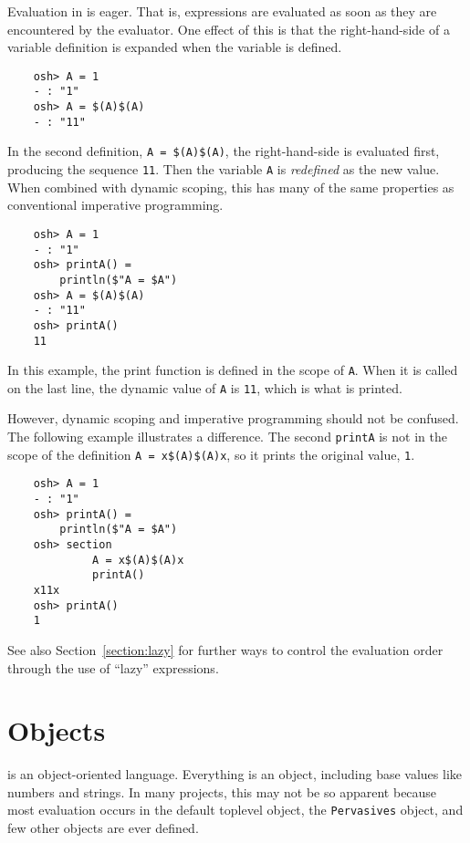 \label{section:eager}

Evaluation in  is eager.  That is, expressions are evaluated as soon as they are
encountered by the evaluator.  One effect of this is that the right-hand-side of a variable
definition is expanded when the variable is defined.

\begin{verbatim}
    osh> A = 1
    - : "1"
    osh> A = $(A)$(A)
    - : "11"
\end{verbatim}

In the second definition, \verb+A = $(A)$(A)+, the right-hand-side is evaluated first, producing the
sequence \verb+11+.  Then the variable \verb+A+ is \emph{redefined} as the new value.  When combined
with dynamic scoping, this has many of the same properties as conventional imperative programming.

\begin{verbatim}
    osh> A = 1
    - : "1"
    osh> printA() =
        println($"A = $A")
    osh> A = $(A)$(A)
    - : "11"
    osh> printA()
    11
\end{verbatim}

In this example, the print function is defined in the scope of \verb+A+.  When it is called on
the last line, the dynamic value of \verb+A+ is \verb+11+, which is what is printed.

However, dynamic scoping and imperative programming should not be confused.  The following example
illustrates a difference.  The second \verb+printA+ is not in the scope of the definition
\verb+A = x$(A)$(A)x+, so it prints the original value, \verb+1+.

\begin{verbatim}
    osh> A = 1
    - : "1"
    osh> printA() =
        println($"A = $A")
    osh> section
             A = x$(A)$(A)x
             printA()
    x11x
    osh> printA()
    1
\end{verbatim}

See also Section~\ref{section:lazy} for further ways to control the evaluation order through the use
of ``lazy'' expressions.

\section{Objects}

 is an object-oriented language.  Everything is an object, including
base values like numbers and strings.  In many projects, this may not be so apparent
because most evaluation occurs in the default toplevel object, the \verb+Pervasives+
object, and few other objects are ever defined.

